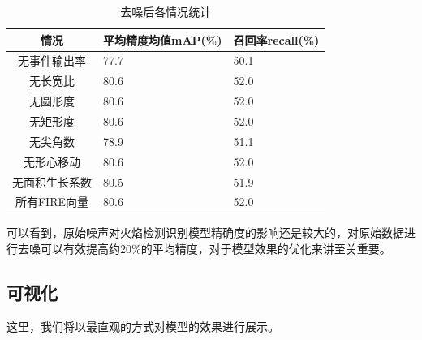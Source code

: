 \begin{table}[ht]
    \centering
    \caption{去噪后各情况统计}
    \begin{tabularx}{0.7\textwidth}{c|X|X}
        \toprule
        情况&平均精度均值mAP(\%)&召回率recall(\%)\\
        \midrule
        无事件输出率&77.7&50.1\\
        无长宽比&80.6&52.0\\
        无圆形度&80.6&52.0\\
        无矩形度&80.6&52.0\\
        无尖角数&78.9&51.1\\
        无形心移动&80.6&52.0\\
        无面积生长系数&80.5&51.9\\
        所有FIRE向量&80.6&52.0\\
        \bottomrule
    \end{tabularx}
    \label{噪后}
\end{table}

可以看到，原始噪声对火焰检测识别模型精确度的影响还是较大的，对原始数据进行去噪可以有效提高约20\%的平均精度，对于模型效果的优化来讲至关重要。

\subsection{可视化}
这里，我们将以最直观的方式对模型的效果进行展示。


